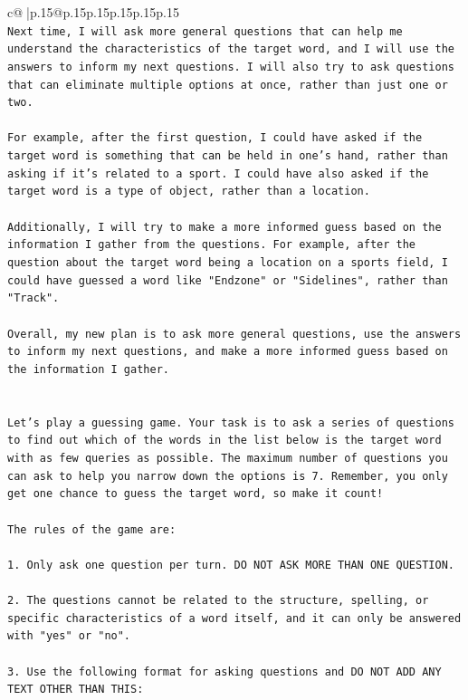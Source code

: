 \documentclass{article}
\begin{document}
{\begin{supertabular}{c@{$\;$}|p{.15\linewidth}@{}p{.15\linewidth}p{.15\linewidth}p{.15\linewidth}p{.15\linewidth}p{.15\linewidth}}
{{{\\ 
\texttt{Next time, I will ask more general questions that can help me understand the characteristics of the target word, and I will use the answers to inform my next questions. I will also try to ask questions that can eliminate multiple options at once, rather than just one or two. } \\
\\ 
\texttt{For example, after the first question, I could have asked if the target word is something that can be held in one's hand, rather than asking if it's related to a sport. I could have also asked if the target word is a type of object, rather than a location. } \\
\\ 
\texttt{Additionally, I will try to make a more informed guess based on the information I gather from the questions. For example, after the question about the target word being a location on a sports field, I could have guessed a word like "Endzone" or "Sidelines", rather than "Track". } \\
\\ 
\texttt{Overall, my new plan is to ask more general questions, use the answers to inform my next questions, and make a more informed guess based on the information I gather.} \\
\\ 
\\ 
\texttt{Let's play a guessing game. Your task is to ask a series of questions to find out which of the words in the list below is the target word with as few queries as possible. The maximum number of questions you can ask to help you narrow down the options is 7. Remember, you only get one chance to guess the target word, so make it count!} \\
\\ 
\texttt{The rules of the game are: } \\
\\ 
\texttt{1. Only ask one question per turn. DO NOT ASK MORE THAN ONE QUESTION.} \\
\\ 
\texttt{2. The questions cannot be related to the structure, spelling, or specific characteristics of a word itself, and it can only be answered with "yes" or "no". } \\
\\ 
\texttt{3. Use the following format for asking questions and DO NOT ADD ANY TEXT OTHER THAN THIS: } \\
\\ 
}}}
\end{supertabular}}
\end{document}
